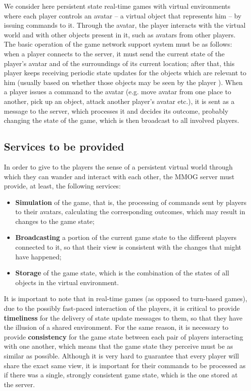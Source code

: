 \documentclass[]{usiinfprospectus}
\begin{document}
We consider here persistent state real-time games with virtual environments where each player controls an avatar -- a virtual object that represents him -- by issuing commands to it. Through the avatar, the player interacts with the virtual world and with other objects present in it, such as avatars from other players. The basic operation of the game network support system must be as follows: when a player connects to the server, it must send the current state of the player's avatar and of the surroundings of its current location; after that, this player keeps receiving periodic state updates for the objects which are relevant to him (usually based on whether those objects may be seen by the player \cite{bezerra2008a3,ahmed2008dai,minson2005aim}). When a player issues a command to the avatar (e.g. move avatar from one place to another, pick up an object, attack another player's avatar etc.), it is sent as a message to the server, which processes it and decides its outcome, probably changing the state of the game, which is then broadcast to all involved players.

\subsection{Services to be provided} \label{sec:services}

In order to give to the players the sense of a persistent virtual world through which they can wander and interact with each other, the MMOG server must provide, at least, the following services:

\begin{itemize}
	\item \textbf{Simulation} of the game, that is, the processing of commands sent by players to their avatars, calculating the corresponding outcomes, which may result in changes to the game state;
	\item \textbf{Broadcasting} a portion of the current game state to the different players connected to it, so that their view is consistent with the changes that might have happened;
	\item \textbf{Storage} of the game state, which is the combination of the states of all objects in the virtual environment.
\end{itemize}

It is important to note that in real-time games (as opposed to turn-based games), due to the possibly fast-paced interaction of the players, it is critical to provide \textbf{timeliness} for the delivery of state update messages to them, so that they have the illusion of a shared environment. For the same reason, it is necessary to provide \textbf{consistency} for the game state between each pair of players interacting with one another, which means that the game state they perceive must be as similar as possible. Although it is very hard to guarantee that every player will share the exact same view, it is important for their commands to be processed as if there was a single, strongly consistent game state, which is the one stored at the server. 
\end{document}
